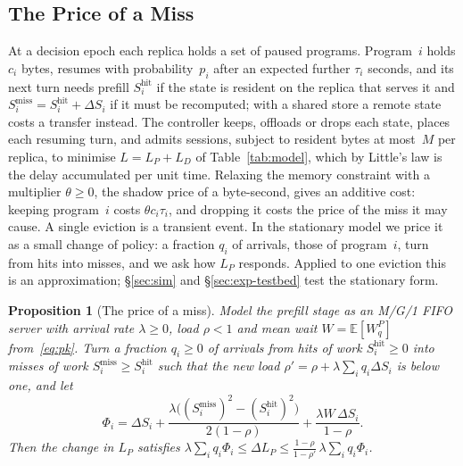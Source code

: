 \documentclass{article}
\newcommand{\leanref}[1]{}
\newcommand{\provedby}[1]{}
\theoremstyle{plain}
\newtheorem{proposition}{Proposition}
\theoremstyle{definition}
\theoremstyle{remark}
\newcommand{\E}{\mathbb{E}}
\begin{document}
\subsection{The Price of a Miss}\label{sec:problem}\label{sec:price}

At a decision epoch each replica holds a set of paused programs.
Program~$i$ holds $c_i$ bytes, resumes with probability~$p_i$ after an
expected further $\tau_i$ seconds, and its next turn needs prefill
$S_i^{\mathrm{hit}}$ if the state is resident on the replica that
serves it and $S_i^{\mathrm{miss}}=S_i^{\mathrm{hit}}+\Delta S_i$ if it
must be recomputed; with a shared store a remote state costs a transfer
instead. The controller keeps, offloads or drops each state, places
each resuming turn, and admits sessions, subject to resident bytes at
most~$M$ per replica, to minimise $L=L_P+L_D$ of Table~\ref{tab:model},
which by Little's law is the delay accumulated per unit time.
Relaxing the memory constraint with a multiplier $\theta\ge0$, the
shadow price of a byte-second, gives an additive cost: keeping
program~$i$ costs $\theta c_i\tau_i$, and dropping it costs the price
of the miss it may cause. A single eviction is a transient event. In the stationary model we
price it as a small change of policy: a fraction $q_i$ of arrivals,
those of program~$i$, turn from hits into misses, and we ask how $L_P$
responds. Applied to one eviction this is an approximation;
\S\ref{sec:sim} and \S\ref{sec:exp-testbed} test the stationary form.

\begin{proposition}[The price of a miss]\label{prop:price}
Model the prefill stage as an M/G/1 FIFO server with arrival rate
$\lambda\ge0$, load $\rho<1$ and mean wait $W=\E[W_q^P]$
from~\eqref{eq:pk}. Turn a fraction $q_i\ge0$ of arrivals from hits of
work $S_i^{\mathrm{hit}}\ge0$ into misses of work
$S_i^{\mathrm{miss}}\ge S_i^{\mathrm{hit}}$ such that the new load
$\rho'=\rho+\lambda\sum_iq_i\Delta S_i$ is below one, and let
\begin{equation}\label{eq:price}
  \Phi_i=\Delta S_i
   +\frac{\lambda\bigl((S_i^{\mathrm{miss}})^2-(S_i^{\mathrm{hit}})^2\bigr)}{2(1-\rho)}
   +\frac{\lambda W\,\Delta S_i}{1-\rho}.
\end{equation}
Then the change in $L_P$ satisfies
$\lambda\sum_iq_i\Phi_i\le\Delta L_P\le\frac{1-\rho}{1-\rho'}\,
\lambda\sum_iq_i\Phi_i$.
\provedby{\leanref{missPrice\_lower}, \leanref{missPrice\_upper}, \leanref{missPrice\_aggregate\_exact}}
\end{proposition}
\end{document}
